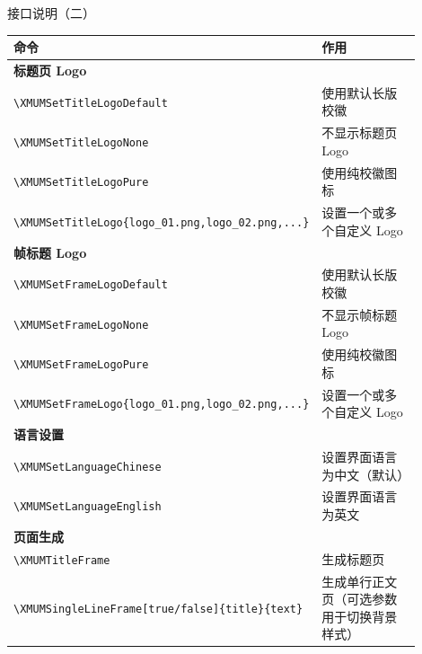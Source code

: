 \documentclass[aspectratio=169,11pt]{ctexbeamer}
\begin{document}
\begin{frame}{接口说明（二）}
    \begin{table}
        \centering
        \tiny
        \begin{tabular}{p{0.45\linewidth}p{0.45\linewidth}}
            \toprule
            命令 & 作用 \\
            \midrule
            \multicolumn{2}{l}{\textbf{标题页 Logo}} \\
            \texttt{\textbackslash XMUMSetTitleLogoDefault} & 使用默认长版校徽 \\
            \texttt{\textbackslash XMUMSetTitleLogoNone} & 不显示标题页 Logo \\
            \texttt{\textbackslash XMUMSetTitleLogoPure} & 使用纯校徽图标 \\
            \texttt{\textbackslash XMUMSetTitleLogo\{logo\_01.png,logo\_02.png,...\}} & 设置一个或多个自定义 Logo \\
            \midrule
            \multicolumn{2}{l}{\textbf{帧标题 Logo}} \\
            \texttt{\textbackslash XMUMSetFrameLogoDefault} & 使用默认长版校徽 \\
            \texttt{\textbackslash XMUMSetFrameLogoNone} & 不显示帧标题 Logo \\
            \texttt{\textbackslash XMUMSetFrameLogoPure} & 使用纯校徽图标 \\
            \texttt{\textbackslash XMUMSetFrameLogo\{logo\_01.png,logo\_02.png,...\}} & 设置一个或多个自定义 Logo \\
            \midrule
            \multicolumn{2}{l}{\textbf{语言设置}} \\
            \texttt{\textbackslash XMUMSetLanguageChinese} & 设置界面语言为中文（默认） \\
            \texttt{\textbackslash XMUMSetLanguageEnglish} & 设置界面语言为英文 \\
            \midrule
            \multicolumn{2}{l}{\textbf{页面生成}} \\
            \texttt{\textbackslash XMUMTitleFrame} & 生成标题页 \\
            \texttt{\textbackslash XMUMSingleLineFrame[true/false]\{title\}\{text\}} & 生成单行正文页（可选参数用于切换背景样式） \\
            \bottomrule
        \end{tabular}
    \end{table}
\end{frame}
\end{document}

